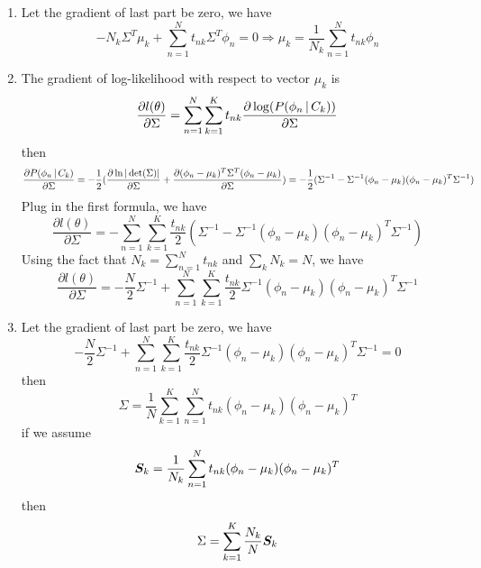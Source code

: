 \documentclass[submit]{harvardml}
\begin{document}
\begin{enumerate}
    \item Let the gradient of last part be zero, we have
    $$ - N_k\Sigma^T\mu_k + \sum_{n=1}^N t_{nk}\Sigma^T\phi_n = 0 \Rightarrow \mu_k = \frac{1}{N_k} \sum_{n=1}^N t_{nk}\phi_n $$
    
    \item The gradient of log-likelihood with respect to vector $\mu_k$ is 
    $$ \frac{\partial l(\theta)}{\partial \Sigma} = \sum_{n=1}^{N} \sum_{k=1}^K t_{nk} \frac{\partial \log(P(\phi_n \,|\, C_k))}{\partial \Sigma} $$
    then 
    $$ \frac{\partial P(\phi_n \,|\, C_k)}{\partial \Sigma} = -\frac{1}{2} (\frac{\partial\ln|\det(\Sigma)|}{\partial\Sigma} + \frac{\partial(\phi_n - \mu_k)^T\Sigma^T(\phi_n - \mu_k)}{\partial\Sigma}) = -\frac{1}{2} (\Sigma^{-1} - \Sigma^{-1}(\phi_n - \mu_k)(\phi_n - \mu_k)^T\Sigma^{-1}) $$
    Plug in the first formula, we have
    $$ \frac{\partial l(\theta)}{\partial \Sigma} = -\sum_{n=1}^{N} \sum_{k=1}^K \frac{t_{nk}}{2} (\Sigma^{-1} - \Sigma^{-1}(\phi_n - \mu_k)(\phi_n - \mu_k)^T\Sigma^{-1}) $$ 
    Using the fact that $ N_k = \sum_{n=1}^N t_{nk} $ and $\sum_k N_k = N$, we have
    $$ \frac{\partial l(\theta)}{\partial \Sigma} = -\frac{N}{2}\Sigma^{-1} + \sum_{n=1}^{N} \sum_{k=1}^K \frac{t_{nk}}{2}\Sigma^{-1}(\phi_n - \mu_k)(\phi_n - \mu_k)^T\Sigma^{-1} $$ 
    
    \item Let the gradient of last part be zero, we have
    $$ -\frac{N}{2}\Sigma^{-1} + \sum_{n=1}^{N} \sum_{k=1}^K \frac{t_{nk}}{2}\Sigma^{-1}(\phi_n - \mu_k)(\phi_n - \mu_k)^T\Sigma^{-1} = 0 $$
    then 
    $$ \Sigma = \frac{1}{N} \sum_{k=1}^K \sum_{n=1}^N t_{nk} (\phi_n - \mu_k)(\phi_n - \mu_k)^T $$
    if we assume 
    $$ \boldsymbol{S}_k = \frac{1}{N_k} \sum_{n=1}^N t_{nk} (\phi_n - \mu_k)(\phi_n - \mu_k)^T $$
    then
    $$ \Sigma = \sum_{k=1}^K \frac{N_k}{N} \boldsymbol{S}_k $$
\end{enumerate}


\newpage
\end{document}
